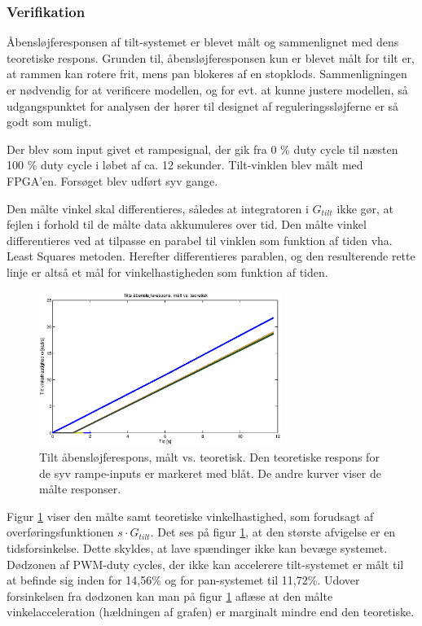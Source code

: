 \subsubsection{Verifikation}
\label{subsec:verifikation}
Åbensløjferesponsen af tilt-systemet er blevet målt og sammenlignet med dens teoretiske respons.
Grunden til, åbensløjferesponsen kun er blevet målt for tilt er, at rammen kan rotere frit,
mens pan blokeres af en stopklods.
Sammenligningen er nødvendig for at verificere modellen, og for evt. at kunne justere modellen,
så udgangspunktet for analysen der hører til designet af reguleringssløjferne er så godt som muligt.

Der blev som input givet et rampesignal, der gik fra 0 \% duty cycle til næsten 100 \% duty cycle
i løbet af ca. 12 sekunder. Tilt-vinklen blev målt med FPGA'en.
Forsøget blev udført syv gange.

Den målte vinkel skal differentieres, således at integratoren i \(G_{tilt}\) ikke gør,
at fejlen i forhold til de målte data akkumuleres over tid.
Den målte vinkel differentieres ved at tilpasse en parabel
til vinklen som funktion af tiden vha. Least Squares metoden. Herefter differentieres
parablen, og den resulterende rette linje er altså et mål for vinkelhastigheden som funktion af tiden.

\begin{figure}[th!]
	\centering
	\includegraphics[width=0.7\textwidth]{./graphics/openloopVelocity1.eps}
	\caption[Tilt åbensløjferespons, målt vs. teoretisk]
		{Tilt åbensløjferespons, målt vs. teoretisk.
		Den teoretiske respons for de syv rampe-inputs er markeret med blåt.
		De andre kurver viser de målte responser.}
	\label{fig:openloopV1}
\end{figure}

Figur \ref{fig:openloopV1} viser den målte samt teoretiske vinkelhastighed,
som forudsagt af overføringsfunktionen \(s\cdot{}G_{tilt}\).
Det ses på figur \ref{fig:openloopV1}, at den største afvigelse er en tidsforsinkelse.
Dette skyldes, at lave spændinger ikke kan bevæge systemet.
Dødzonen af PWM-duty cycles, der ikke kan accelerere tilt-systemet er målt til at befinde sig inden for 14,56\% og for pan-systemet til 11,72\%.
Udover forsinkelsen fra dødzonen kan man på figur \ref{fig:openloopV1} aflæse
at den målte vinkelacceleration (hældningen af grafen) er marginalt mindre end den teoretiske.

